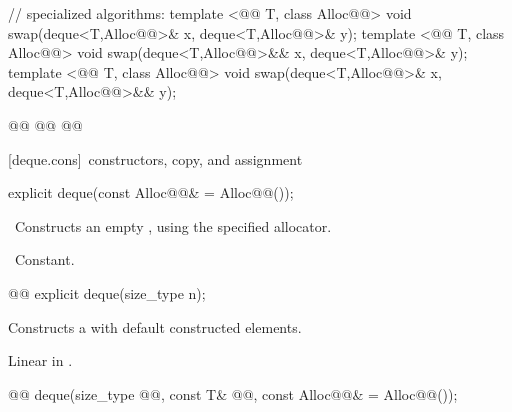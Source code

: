\documentclass[american,twoside]{book}
\begin{document}
\begin{codeblock}
{  // specialized algorithms:
  template <@@ T, class Alloc@@>
    void swap(deque<T,Alloc@@>& x, deque<T,Alloc@@>& y);
  template <@@ T, class Alloc@@>
    void swap(deque<T,Alloc@@>&& x, deque<T,Alloc@@>& y);
  template <@@ T, class Alloc@@>
    void swap(deque<T,Alloc@@>& x, deque<T,Alloc@@>&& y);

  @@
    @@
      @@
}
\end{codeblock}

[deque.cons]{\ constructors, copy, and assignment}

\begin{itemdecl}
explicit deque(const Alloc@@& = Alloc@@());
\end{itemdecl}

\begin{itemdescr}
\pnum
\effects\ 
Constructs an empty
,
using the specified allocator.

\pnum
\complexity\ 
Constant.
\end{itemdescr}

\begin{itemdecl}
@@ explicit deque(size_type n);
\end{itemdecl}

\begin{itemdescr}
\pnum
\effects Constructs a  with
 default constructed elements.

\pnum
{}

\pnum
\complexity Linear in .
\end{itemdescr}

\begin{itemdecl}
@@
deque(size_type @@, const T& @@,
      const Alloc@@& = Alloc@\removedConcepts{ator}@());
\end{itemdecl}
\end{document}
